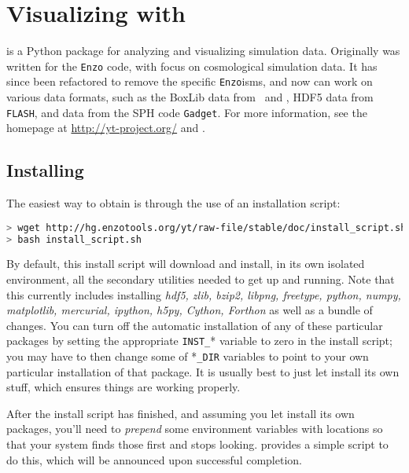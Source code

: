 \section{Visualizing with \yt}
\yt is a Python package for analyzing and visualizing simulation data.
Originally \yt was written for the {\tt Enzo} code, with focus on
cosmological simulation data.  It has since been refactored to remove
the specific {\tt Enzo}isms, and now can work on various data formats,
such as the BoxLib data from \maestro\ and \castro, HDF5 data
from {\tt FLASH}, and data from the SPH code {\tt Gadget}.  For more
information, see the \yt homepage at \url{http://yt-project.org/} and
\cite{yt}.


\subsection{Installing \yt}
The easiest way to obtain \yt is through the use of an installation script:
\begin{lstlisting}[language=bash,mathescape=false]
> wget http://hg.enzotools.org/yt/raw-file/stable/doc/install_script.sh
> bash install_script.sh
\end{lstlisting}
By default, this \yt install script will download and install, in its
own isolated environment, all the secondary utilities needed to get
\yt up and running.  Note that this currently includes installing {\it
  hdf5, zlib, bzip2, libpng, freetype, python, numpy, matplotlib,
  mercurial, ipython, h5py, Cython, Forthon} as well as a  bundle of changes.  You can turn off the automatic
installation of any of these particular packages by setting the
appropriate {\tt INST\_}* variable to zero in the install script; you
may have to then change some of *{\tt \_DIR} variables to point to
your own particular installation of that package.  It is usually best
to just let \yt install its own stuff, which ensures things are
working properly.

After the install script has finished, and assuming you let \yt
install its own packages, you'll need to {\it prepend} some
environment variables with \yt locations so that your system finds
those first and stops looking.  \yt provides a simple script to
do this, which will be announced upon successful completion.

